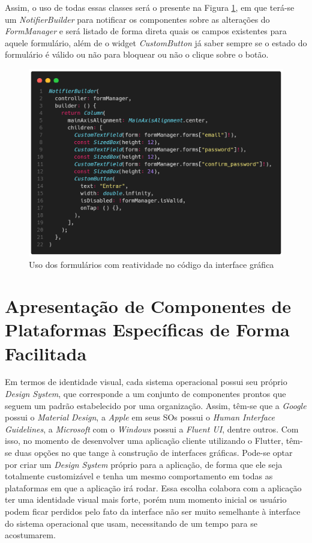 \documentclass[12pt, %
openright, 
oneside, %
a4paper,    %
brazil]{facom-ufu-abntex2}
\begin{document}
Assim, o uso de todas essas classes será o presente na Figura \ref{fig:use_of_form_proposal}, em que terá-se um \textit{NotifierBuilder} para notificar os componentes sobre as alterações do \textit{FormManager} e será listado de forma direta quais os campos existentes para aquele formulário, além de o widget \textit{CustomButton} já saber sempre se o estado do formulário é válido ou não para bloquear ou não o clique sobre o botão.

\begin{figure}[ht]
    \centering
    \includegraphics[width=.65\textwidth, trim={0 30 0 100}, clip]{figures/forms/use_of_form_proposal.png}
    \caption{Uso dos formulários com reatividade no código da interface gráfica}
    \label{fig:use_of_form_proposal}
\end{figure}


\section{Apresentação de Componentes de Plataformas Específicas de Forma Facilitada} \label{sec:plaform_components}

Em termos de identidade visual, cada sistema operacional possui seu próprio \textit{Design System}, que corresponde a um conjunto de componentes prontos que seguem um padrão estabelecido por uma organização. Assim, têm-se que a \textit{Google} possui o \textit{Material Design}, a \textit{Apple} em seus SOs possui o \textit{Human Interface Guidelines}, a \textit{Microsoft} com o \textit{Windows} possui a \textit{Fluent UI}, dentre outros. Com isso, no momento de desenvolver uma aplicação cliente utilizando o Flutter, têm-se duas opções no que tange à construção de interfaces gráficas. Pode-se optar por criar um \textit{Design System} próprio para a aplicação, de forma que ele seja totalmente customizável e tenha um mesmo comportamento em todas as plataformas em que a aplicação irá rodar. Essa escolha colabora com a aplicação ter uma identidade visual mais forte, porém num momento inicial os usuário podem ficar perdidos pelo fato da interface não ser muito semelhante à interface do sistema operacional que usam, necessitando de um tempo para se acostumarem.
\end{document}

